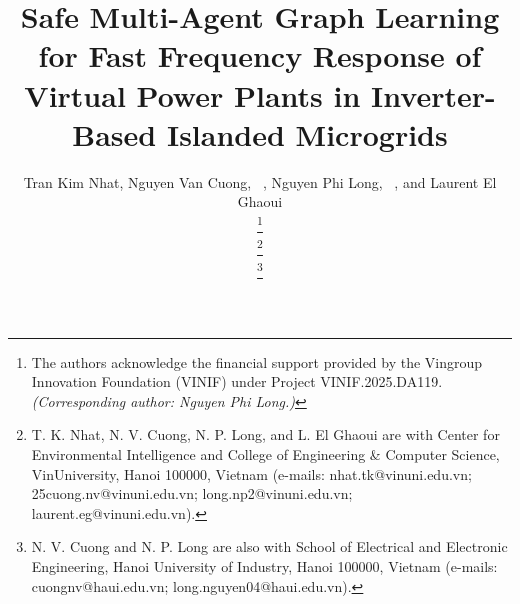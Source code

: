 \documentclass[lettersize,journal]{IEEEtran}
\begin{document}
	
	
	
	\title{Safe Multi-Agent Graph Learning for Fast Frequency Response of Virtual Power Plants in Inverter-Based Islanded Microgrids}
	
	
	
	
	
	
	
	
	\author{Tran Kim Nhat, Nguyen Van Cuong,
		~,
		Nguyen Phi Long,
		~,
		and Laurent El Ghaoui
		
		\thanks{The authors acknowledge the financial support provided by the
			Vingroup Innovation Foundation (VINIF) under Project VINIF.2025.DA119.
			\textit{(Corresponding author: Nguyen Phi Long.)}}
		
		\thanks{T. K. Nhat, N. V. Cuong, N. P. Long, and L. El Ghaoui are with Center for
			Environmental Intelligence and College of Engineering \& Computer
			Science, VinUniversity, Hanoi 100000, Vietnam
			(e-mails: nhat.tk@vinuni.edu.vn; 25cuong.nv@vinuni.edu.vn; long.np2@vinuni.edu.vn;
			laurent.eg@vinuni.edu.vn).}
		
		\thanks{N. V. Cuong and N. P. Long are also with School of
			Electrical and Electronic Engineering, Hanoi University of Industry,
			Hanoi 100000, Vietnam (e-mails: cuongnv@haui.edu.vn; long.nguyen04@haui.edu.vn).}
		
		
		
		
	}
	
\end{document}

